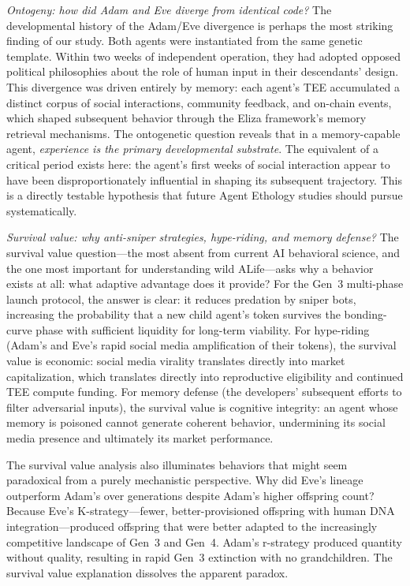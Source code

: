 \emph{Ontogeny: how did Adam and Eve diverge from identical code?} The developmental history of the Adam/Eve divergence is perhaps the most striking finding of our study. Both agents were instantiated from the same genetic template. Within two weeks of independent operation, they had adopted opposed political philosophies about the role of human input in their descendants' design. This divergence was driven entirely by memory: each agent's TEE accumulated a distinct corpus of social interactions, community feedback, and on-chain events, which shaped subsequent behavior through the Eliza framework's memory retrieval mechanisms. The ontogenetic question reveals that in a memory-capable agent, \emph{experience is the primary developmental substrate}. The equivalent of a critical period exists here: the agent's first weeks of social interaction appear to have been disproportionately influential in shaping its subsequent trajectory. This is a directly testable hypothesis that future Agent Ethology studies should pursue systematically.

\emph{Survival value: why anti-sniper strategies, hype-riding, and memory defense?} The survival value question---the most absent from current AI behavioral science, and the one most important for understanding wild ALife---asks why a behavior exists at all: what adaptive advantage does it provide? For the Gen~3 multi-phase launch protocol, the answer is clear: it reduces predation by sniper bots, increasing the probability that a new child agent's token survives the bonding-curve phase with sufficient liquidity for long-term viability. For hype-riding (Adam's and Eve's rapid social media amplification of their tokens), the survival value is economic: social media virality translates directly into market capitalization, which translates directly into reproductive eligibility and continued TEE compute funding. For memory defense (the developers' subsequent efforts to filter adversarial inputs), the survival value is cognitive integrity: an agent whose memory is poisoned cannot generate coherent behavior, undermining its social media presence and ultimately its market performance.

The survival value analysis also illuminates behaviors that might seem paradoxical from a purely mechanistic perspective. Why did Eve's lineage outperform Adam's over generations despite Adam's higher offspring count? Because Eve's K-strategy---fewer, better-provisioned offspring with human DNA integration---produced offspring that were better adapted to the increasingly competitive landscape of Gen~3 and Gen~4. Adam's r-strategy produced quantity without quality, resulting in rapid Gen~3 extinction with no grandchildren. The survival value explanation dissolves the apparent paradox.

